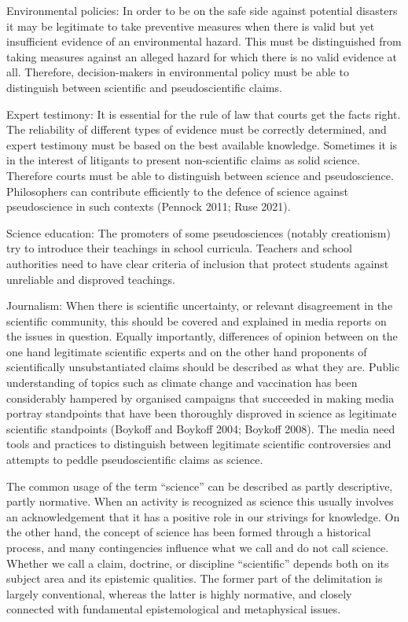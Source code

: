 Environmental policies: In order to be on the safe side against potential
disasters it may be legitimate to take preventive measures when there is valid
but yet insufficient evidence of an environmental hazard. This must be
distinguished from taking measures against an alleged hazard for which there is
no valid evidence at all. Therefore, decision-makers in environmental policy
must be able to distinguish between scientific and pseudoscientific claims.

Expert testimony: It is essential for the rule of law that courts get the facts
right. The reliability of different types of evidence must be correctly
determined, and expert testimony must be based on the best available knowledge.
Sometimes it is in the interest of litigants to present non-scientific claims as
solid science. Therefore courts must be able to distinguish between science and
pseudoscience. Philosophers can contribute efficiently to the defence of science
against pseudoscience in such contexts (Pennock 2011; Ruse 2021).

Science education: The promoters of some pseudosciences (notably creationism)
try to introduce their teachings in school curricula. Teachers and school
authorities need to have clear criteria of inclusion that protect students
against unreliable and disproved teachings.

Journalism: When there is scientific uncertainty, or relevant disagreement in
the scientific community, this should be covered and explained in media reports
on the issues in question. Equally importantly, differences of opinion between
on the one hand legitimate scientific experts and on the other hand proponents
of scientifically unsubstantiated claims should be described as what they are.
Public understanding of topics such as climate change and vaccination has been
considerably hampered by organised campaigns that succeeded in making media
portray standpoints that have been thoroughly disproved in science as legitimate
scientific standpoints (Boykoff and Boykoff 2004; Boykoff 2008). The media need
tools and practices to distinguish between legitimate scientific controversies
and attempts to peddle pseudoscientific claims as science.

The common usage of the term “science” can be described as partly descriptive,
partly normative. When an activity is recognized as science this usually
involves an acknowledgement that it has a positive role in our strivings for
knowledge. On the other hand, the concept of science has been formed through a
historical process, and many contingencies influence what we call and do not
call science. Whether we call a claim, doctrine, or discipline “scientific”
depends both on its subject area and its epistemic qualities. The former part of
the delimitation is largely conventional, whereas the latter is highly
normative, and closely connected with fundamental epistemological and
metaphysical issues.

